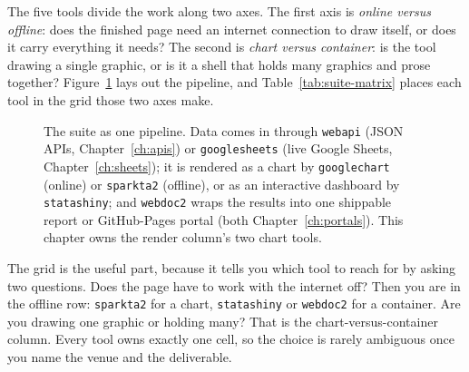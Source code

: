 \documentclass[
    a4paper,
    fontsize=10pt,
    twoside=true,
    numbers=noenddot,
]{kaobook}
\begin{document}
The five tools divide the work along two axes. The first axis is \emph{online versus offline}: does the finished page need an internet connection to draw itself, or does it carry everything it needs? The second is \emph{chart versus container}: is the tool drawing a single graphic, or is it a shell that holds many graphics and prose together? Figure~\ref{fig:suite-pipeline} lays out the pipeline, and Table~\ref{tab:suite-matrix} places each tool in the grid those two axes make.

\begin{figure}[htbp]
\centering
{}
\caption[The visualization suite pipeline]{The suite as one pipeline. Data comes in through \texttt{webapi} (JSON APIs, Chapter~\ref{ch:apis}) or \texttt{googlesheets} (live Google Sheets, Chapter~\ref{ch:sheets}); it is rendered as a chart by \texttt{googlechart} (online) or \texttt{sparkta2} (offline), or as an interactive dashboard by \texttt{statashiny}; and \texttt{webdoc2} wraps the results into one shippable report or GitHub-Pages portal (both Chapter~\ref{ch:portals}). This chapter owns the render column's two chart tools.}
\label{fig:suite-pipeline}
\end{figure}

The grid is the useful part, because it tells you which tool to reach for by asking two questions. Does the page have to work with the internet off? Then you are in the offline row: \texttt{sparkta2} for a chart, \texttt{statashiny} or \texttt{webdoc2} for a container. Are you drawing one graphic or holding many? That is the chart-versus-container column. Every tool owns exactly one cell, so the choice is rarely ambiguous once you name the venue and the deliverable.
\end{document}
